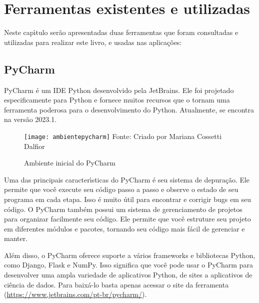 

\chapter{Ferramentas existentes e utilizadas}

Neste cap\'{\i}tulo serão apresentadas duas ferramentas que foram consultadas e utilizadas para realizar este livro, e usadas nas aplica\c{c}\~{o}es:

\section{PyCharm}

PyCharm \'{e} um IDE Python desenvolvido pela JetBrains. Ele foi projetado especificamente para Python e fornece muitos recursos que o tornam uma ferramenta poderosa para o desenvolvimento do Python. Atualmente, se encontra na vers\~{a}o 2023.1.

\begin{figure}[H]
	\begin{center}
		\caption{Ambiente inicial do PyCharm} \label{ambientepycharm}
		\texttt{[image: ambientepycharm]} 
		\newline
		Fonte: Criado por Mariana Cossetti Dalfior
	\end{center}
\end{figure}

Uma das principais caracter\'{\i}sticas do PyCharm \'{e} seu sistema de depura\c{c}\~{a}o. Ele permite que voc\^{e} execute seu c\'{o}digo passo a passo e observe o estado de seu programa em cada etapa. Isso \'{e} muito \'{u}til para encontrar e corrigir bugs em seu c\'{o}digo. O PyCharm tamb\'{e}m possui um sistema de gerenciamento de projetos para organizar facilmente seu c\'{o}digo. Ele permite que voc\^{e} estruture seu projeto em diferentes m\'{o}dulos e pacotes, tornando seu c\'{o}digo mais f\'{a}cil de gerenciar e manter.

Al\'{e}m disso, o PyCharm oferece suporte a v\'{a}rios frameworks e bibliotecas Python, como Django, Flask e NumPy. Isso significa que voc\^{e} pode usar o PyCharm para desenvolver uma ampla variedade de aplicativos Python, de sites a aplicativos de ci\^{e}ncia de dados.  Para baix\'{a}-lo basta apenas acessar o site da ferramenta (\url{https://www.jetbrains.com/pt-br/pycharm/}).\newline

